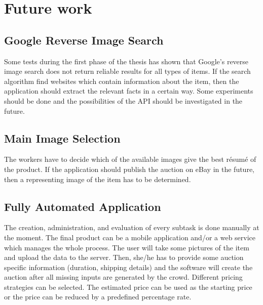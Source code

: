 \section{Future work}
\subsection{Google Reverse Image Search}
Some tests during the first phase of the thesis has shown that Google's reverse image search does not return reliable results for all types of items. If the search algorithm find websites which contain information about the item, then the application should extract the relevant facts in a certain way. Some experiments should be done and the possibilities of the API should be investigated in the future. 
\subsection{Main Image Selection}
The workers have to decide which of the available images give the best r\'{e}sum\'{e} of the product. If the application should publish the auction on eBay in the future, then a representing image of the item has to be determined. 
\subsection{Fully Automated Application}
The creation, administration, and evaluation of every subtask is done manually at the moment. The final product can be a mobile application and/or a web service which manages the whole process. The user will take some pictures of the item and upload the data to the server. Then, she/he has to provide some auction specific information (duration, shipping details) and the software will create the auction after all missing inputs are generated by the crowd. Different pricing strategies can be selected. The estimated price can be used as the starting price or the price can be reduced by a predefined percentage rate. 

